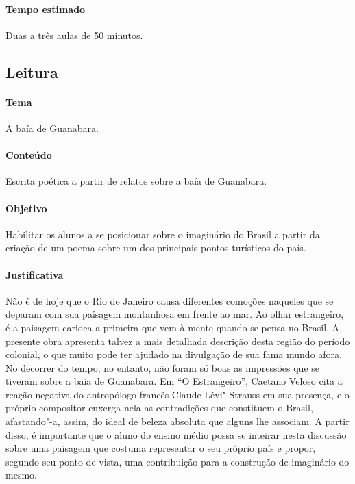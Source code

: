 \documentclass[12pt]{extarticle}
\begin{document}
\paragraph{Tempo estimado} Duas a três aulas de 50 minutos.


\subsection{Leitura}


\paragraph{Tema} A baía de Guanabara.

\paragraph{Conteúdo} Escrita poética a partir de relatos sobre a 
baía de Guanabara.

\paragraph{Objetivo} Habilitar os alunos a se posicionar sobre o imaginário
do Brasil a partir da criação de um poema sobre um dos principais pontos
turísticos do país.

\paragraph{Justificativa} Não é de hoje que o Rio de Janeiro causa 
diferentes comoções naqueles que se deparam com sua paisagem montanhosa
em frente ao mar. Ao olhar estrangeiro, é a paisagem carioca a primeira
que vem à mente quando se pensa no Brasil. 
A presente obra apresenta talvez a mais detalhada descrição desta região
do período colonial, o que muito pode ter ajudado na divulgação de sua 
fama mundo afora. 
No decorrer do tempo, no entanto, não foram só boas as impressões que se 
tiveram sobre a baía de Guanabara. Em ``O Estrangeiro'', Caetano Veloso
cita a reação negativa do antropólogo francês Claude Lévi"-Strauss em sua 
presença, e o próprio compositor enxerga nela as contradições que 
constituem o Brasil, afastando"-a, assim, do ideal de beleza absoluta 
que alguns lhe associam. 
A partir disso, é importante que o aluno do ensino médio possa se inteirar
nesta discussão sobre uma paisagem que costuma representar o seu próprio
país e propor, segundo seu ponto de vista, uma contribuição para a 
construção de imaginário do mesmo. 
\end{document}
